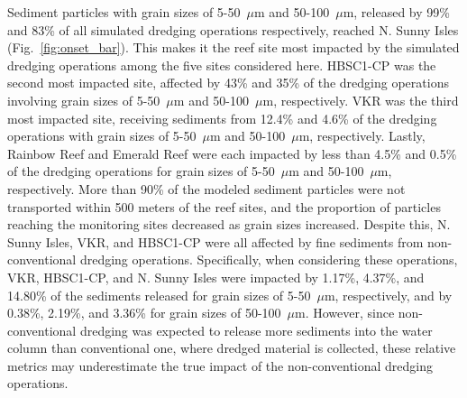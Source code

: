 \documentclass[preprint,12pt,authoryear]{elsarticle}
\begin{document}
Sediment particles with grain sizes of 5-50~$\mu$m and 50-100~$\mu$m, released by 99\% and 83\% of all simulated dredging operations respectively, reached N. Sunny Isles (Fig.~\ref{fig:onset_bar}). This makes it the reef site most impacted by the simulated dredging operations among the five sites considered here. HBSC1-CP was the second most impacted site, affected by 43\% and 35\% of the dredging operations involving grain sizes of 5-50~$\mu$m and 50-100~$\mu$m, respectively. VKR was the third most impacted site, receiving sediments from 12.4\% and 4.6\% of the dredging operations with grain sizes of 5-50~$\mu$m and 50-100~$\mu$m, respectively. Lastly, Rainbow Reef and Emerald Reef were each impacted by less than 4.5\% and 0.5\% of the dredging operations for grain sizes of 5-50~$\mu$m and 50-100~$\mu$m, respectively. More than 90\% of the modeled sediment particles were not transported within 500 meters of the reef sites, and the proportion of particles reaching the monitoring sites decreased as grain sizes increased. Despite this, N. Sunny Isles, VKR, and HBSC1-CP were all affected by fine sediments from non-conventional dredging operations. Specifically, when considering these operations, VKR, HBSC1-CP, and N. Sunny Isles were impacted by 1.17\%, 4.37\%, and 14.80\% of the sediments released for grain sizes of 5-50~$\mu$m, respectively, and by 0.38\%, 2.19\%, and 3.36\% for grain sizes of 50-100~$\mu$m. However, since non-conventional dredging was expected to release more sediments into the water column than conventional one, where dredged material is collected, these relative metrics may underestimate the true impact of the non-conventional dredging operations.
\end{document}
